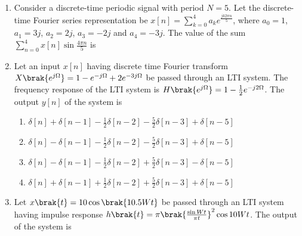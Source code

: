 \documentclass[a4paper, 11pt]{article}
\begin{document}
\begin{enumerate}
    \hfill{}
    
    \item Consider a discrete-time periodic signal with period $N=5$. Let the discrete-time Fourier series  representation be $x[n] = \sum_{k=0}^{4} a_k e^{\frac{jk2\pi n}{5}}$, where $a_0 = 1$, $a_1=3j$, $a_2=2j$, $a_3=-2j$ and $a_4=-3j$. The value of the sum $\sum_{n=0}^{4} x[n] \sin\frac{4\pi n}{5}$ is
    \begin{enumerate}
    \end{enumerate}

    \hfill{}
    
    \item Let an input $x[n]$ having discrete time Fourier transform $X\brak{e^{j\Omega}} = 1 - e^{-j\Omega} + 2e^{-3j\Omega}$ be passed through an LTI system. The frequency response of the LTI system is $H\brak{e^{j\Omega}} = 1 - \frac{1}{2}e^{-j2\Omega}$. The output $y[n]$ of the system is
    
    \begin{enumerate}
        \item $\delta[n]+\delta[n-1]-\frac{1}{2}\delta[n-2]-\frac{5}{2}\delta[n-3]+\delta[n-5]$
        \item $\delta[n]-\delta[n-1]-\frac{1}{2}\delta[n-2]-\frac{5}{2}\delta[n-3]+\delta[n-5]$
        \item $\delta[n]-\delta[n-1]-\frac{1}{2}\delta[n-2]+\frac{5}{2}\delta[n-3]-\delta[n-5]$
        \item $\delta[n]+\delta[n-1]+\frac{1}{2}\delta[n-2]+\frac{5}{2}\delta[n-3]+\delta[n-5]$
    \end{enumerate}

    \hfill{}
    
    \item Let $x\brak{t} = 10 \cos\brak{10.5Wt}$ be passed through an LTI system having impulse response $h\brak{t} = \pi \brak{\frac{\sin Wt}{\pi t}}^2 \cos 10Wt$. The output of the system is
    \begin{enumerate}
    \end{enumerate}
    

\end{enumerate}
\end{document}
